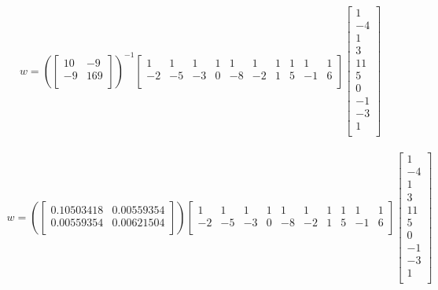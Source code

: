 \documentclass[12pt]{article}
\begin{document}
\begin{enumerate}
\begin{enumerate}
\begin{equation}
	\begin{split}
		w = (\begin{bmatrix}
			10 & -9\\
			-9 & 169\\
		\end{bmatrix})^{-1}\begin{bmatrix}
		1 & 1 & 1 & 1 & 1 & 1 & 1 & 1 & 1 & 1\\
		-2 & -5 & -3 & 0 & -8 & -2 & 1 & 5 & -1 & 6\\
	\end{bmatrix}\begin{bmatrix}
			1\\
			-4\\	
			1\\
			3\\
			11\\
			5\\
			0\\
			-1\\
			-3\\
			1\\
		\end{bmatrix}
	\end{split}
\end{equation}

\begin{equation}
	\begin{split}
		w = (\begin{bmatrix}
			0.10503418 & 0.00559354\\
			0.00559354 & 0.00621504\\
		\end{bmatrix})\begin{bmatrix}
			1 & 1 & 1 & 1 & 1 & 1 & 1 & 1 & 1 & 1\\
			-2 & -5 & -3 & 0 & -8 & -2 & 1 & 5 & -1 & 6\\
		\end{bmatrix}\begin{bmatrix}
			1\\
			-4\\	
			1\\
			3\\
			11\\
			5\\
			0\\
			-1\\
			-3\\
			1\\
		\end{bmatrix}
	\end{split}
\end{equation}


\end{enumerate}
\end{enumerate}
\end{document}
